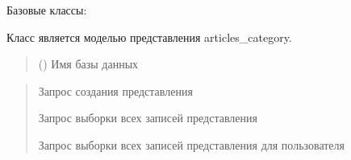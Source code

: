 \documentclass[letterpaper,10pt,russian]{sphinxmanual}
\begin{document}
\begin{fulllineitems}
\label{\detokenize{database.sqlite3_interface.views:database.sqlite3_interface.views.view_articles.ViewArticles}}
\pysigstartsignatures
{}
\pysigstopsignatures
\sphinxAtStartPar
Базовые классы: {\hyperref[\detokenize{database.sqlite3_interface.views:database.sqlite3_interface.views.view.View}]{}}

\sphinxAtStartPar
Класс является моделью представления articles\_category.
\begin{quote}\begin{description}
\sphinxAtStartPar
{} () \textendash{} Имя базы данных

\end{description}\end{quote}
\begin{description}
\begin{quote}\begin{description}
\sphinxAtStartPar
Запрос создания представления

\sphinxAtStartPar
Запрос выборки всех записей представления

\sphinxAtStartPar
Запрос выборки всех записей представления для пользователя

\end{description}\end{quote}


\end{description}
\end{fulllineitems}
\end{document}
